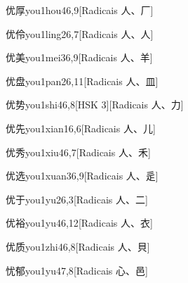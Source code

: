 \begin{entry}{优厚}{you1hou4}{6,9}[Radicais ⼈、⼚]
\end{entry}

\begin{entry}{优伶}{you1ling2}{6,7}[Radicais ⼈、⼈]
\end{entry}

\begin{entry}{优美}{you1mei3}{6,9}[Radicais ⼈、⽺]
\end{entry}

\begin{entry}{优盘}{you1pan2}{6,11}[Radicais ⼈、⽫]
\end{entry}

\begin{entry}{优势}{you1shi4}{6,8}[HSK 3][Radicais ⼈、⼒]
\end{entry}

\begin{entry}{优先}{you1xian1}{6,6}[Radicais ⼈、⼉]
\end{entry}

\begin{entry}{优秀}{you1xiu4}{6,7}[Radicais ⼈、⽲]
\end{entry}

\begin{entry}{优选}{you1xuan3}{6,9}[Radicais ⼈、⾡]
\end{entry}

\begin{entry}{优于}{you1yu2}{6,3}[Radicais ⼈、⼆]
\end{entry}

\begin{entry}{优裕}{you1yu4}{6,12}[Radicais ⼈、⾐]
\end{entry}

\begin{entry}{优质}{you1zhi4}{6,8}[Radicais ⼈、⾙]
\end{entry}

\begin{entry}{忧郁}{you1yu4}{7,8}[Radicais ⼼、⾢]
\end{entry}

